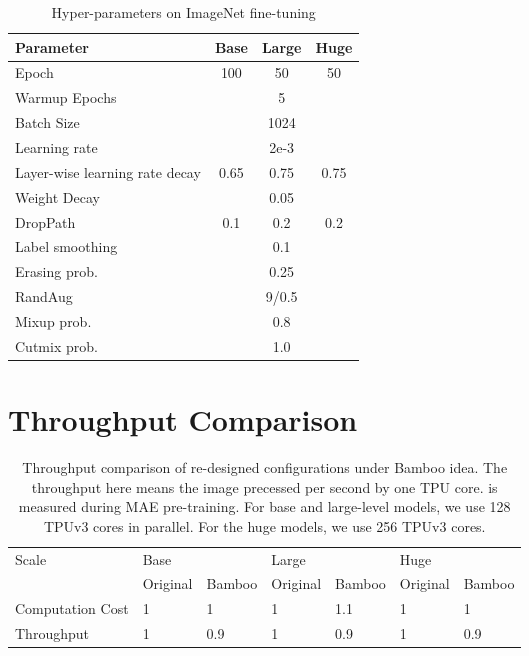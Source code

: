 \documentclass{article}
\theoremstyle{plain}
\theoremstyle{definition}
\theoremstyle{remark}
\begin{document}
\begin{table}[ht]
\caption{Hyper-parameters on ImageNet fine-tuning}
\label{tbl-hyper-parameter-pre-train}
\vskip 0.15in
\begin{center}
\begin{tabular}{l|ccc}
\toprule
Parameter                  & Base  & Large & Huge   \\ \midrule
Epoch                     & 100     & 50  & 50    \\
Warmup Epochs             &      & 5    &        \\
Batch Size                &    & 1024  &       \\
Learning rate             &    & 2e-3  &    \\
Layer-wise learning rate decay & 0.65  & 0.75 & 0.75  \\
Weight Decay              &     & 0.05 &   \\
DropPath                  & 0.1   & 0.2 & 0.2    \\ 
Label smoothing           &     & 0.1  &       \\
Erasing prob.               &     & 0.25  &     \\
RandAug               &   & 9/0.5 &       \\
Mixup prob.               &    & 0.8 &       \\
Cutmix prob.               &    & 1.0 &       \\ \bottomrule
\end{tabular}
\end{center}
\vskip -0.1in
\end{table}


\section{Throughput Comparison}\label{appendix:throughput}


\begin{table*}[ht]
\caption{Throughput comparison of re-designed configurations under Bamboo idea. The throughput here means the image precessed per second by one TPU core. is measured during MAE pre-training. For base and large-level models, we use 128 TPUv3 cores in parallel. For the huge models, we use 256 TPUv3 cores.}
\vspace{5pt}
\centering
\begin{tabular}{l ll ll ll}
\toprule 
Scale                  & \multicolumn{2}{l}{Base} & \multicolumn{2}{l}{Large} & \multicolumn{2}{l}{Huge} \\  \cmidrule(lr){2-3} \cmidrule(lr){4-5}\cmidrule(lr){6-7}
                 & Original & Bamboo & Original & Bamboo & Original & Bamboo  \\ \midrule
Computation Cost  & 1    & 1  & 1    & 1.1 & 1    & 1   \\ 
Throughput  & 1    & 0.9  & 1    & 0.9 & 1    & 0.9   \\ \bottomrule
\end{tabular}
\vspace{-0.3cm}
\label{tbl:throughput}
\end{table*}
\end{document}

